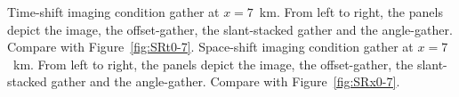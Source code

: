 {
Time-shift imaging condition gather at $x=7$~km.
From left to right, the panels depict
the image,
the offset-gather,
the slant-stacked gather and
the angle-gather.
Compare with Figure~\ref{fig:SRt0-7}. }
{
Space-shift imaging condition gather at $x=7$~km.
From left to right, the panels depict
the image,
the offset-gather,
the slant-stacked gather and
the angle-gather.
Compare with Figure~\ref{fig:SRx0-7}. }

